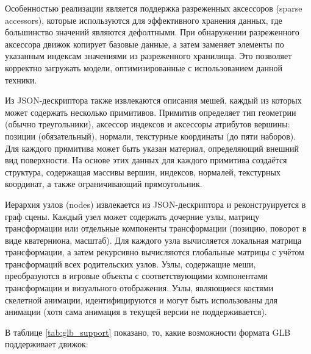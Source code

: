 Особенностью реализации является поддержка разреженных аксессоров (sparse accessors), которые используются для эффективного хранения данных, где большинство значений являются дефолтными. При обнаружении разреженного аксессора движок копирует базовые данные, а затем заменяет элементы по указанным индексам значениями из разреженного хранилища. Это позволяет корректно загружать модели, оптимизированные с использованием данной техники.

Из JSON-дескриптора также извлекаются описания мешей, каждый из которых может содержать несколько примитивов. Примитив определяет тип геометрии (обычно треугольники), аксессор индексов и аксессоры атрибутов вершины: позиции (обязательный), нормали, текстурные координаты (до пяти наборов). Для каждого примитива может быть указан материал, определяющий внешний вид поверхности. На основе этих данных для каждого примитива создаётся структура, содержащая массивы вершин, индексов, нормалей, текстурных координат, а также ограничивающий прямоугольник.

Иерархия узлов (nodes) извлекается из JSON-дескриптора и реконструируется в граф сцены. Каждый узел может содержать дочерние узлы, матрицу трансформации или отдельные компоненты трансформации (позицию, поворот в виде кватерниона, масштаб). Для каждого узла вычисляется локальная матрица трансформации, а затем рекурсивно вычисляются глобальные матрицы с учётом трансформаций всех родительских узлов. Узлы, содержащие меши, преобразуются в игровые объекты с соответствующими компонентами трансформации и визуального отображения. Узлы, являющиеся костями скелетной анимации, идентифицируются и могут быть использованы для анимации (хотя сама анимация в текущей версии не поддерживается).

В таблице \ref{tab:glb_support} показано, то, какие возможности формата GLB поддерживает движок:

